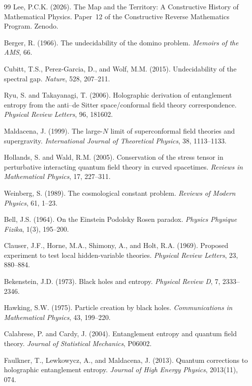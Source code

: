 \documentclass[11pt,a4paper]{report}
\theoremstyle{plain}
\theoremstyle{definition}
\theoremstyle{remark}
\begin{document}
\begin{thebibliography}{99}
 Lee, P.C.K. (2026). The Map and the Territory: A Constructive History of Mathematical Physics. Paper~12 of the Constructive Reverse Mathematics Program. Zenodo.

 Berger, R. (1966). The undecidability of the domino problem. \emph{Memoirs of the AMS}, 66.

 Cubitt, T.S., Perez-Garcia, D., and Wolf, M.M. (2015). Undecidability of the spectral gap. \emph{Nature}, 528, 207--211.

 Ryu, S. and Takayanagi, T. (2006). Holographic derivation of entanglement entropy from the anti--de Sitter space/conformal field theory correspondence. \emph{Physical Review Letters}, 96, 181602.

 Maldacena, J. (1999). The large-$N$ limit of superconformal field theories and supergravity. \emph{International Journal of Theoretical Physics}, 38, 1113--1133.

 Hollands, S. and Wald, R.M. (2005). Conservation of the stress tensor in perturbative interacting quantum field theory in curved spacetimes. \emph{Reviews in Mathematical Physics}, 17, 227--311.

 Weinberg, S. (1989). The cosmological constant problem. \emph{Reviews of Modern Physics}, 61, 1--23.


 Bell, J.S. (1964). On the Einstein Podolsky Rosen paradox. \emph{Physics Physique Fizika}, 1(3), 195--200.

 Clauser, J.F., Horne, M.A., Shimony, A., and Holt, R.A. (1969). Proposed experiment to test local hidden-variable theories. \emph{Physical Review Letters}, 23, 880--884.

 Bekenstein, J.D. (1973). Black holes and entropy. \emph{Physical Review D}, 7, 2333--2346.

 Hawking, S.W. (1975). Particle creation by black holes. \emph{Communications in Mathematical Physics}, 43, 199--220.

 Calabrese, P. and Cardy, J. (2004). Entanglement entropy and quantum field theory. \emph{Journal of Statistical Mechanics}, P06002.

 Faulkner, T., Lewkowycz, A., and Maldacena, J. (2013). Quantum corrections to holographic entanglement entropy. \emph{Journal of High Energy Physics}, 2013(11), 074.


\end{thebibliography}
\end{document}
